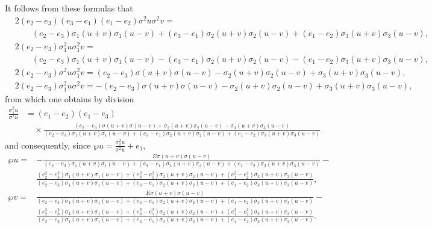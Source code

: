\documentclass{article}
\begin{document}
It follows from these formulas that
\begin{align*}
&2(e_2 - e_3)(e_3 - e_1)(e_1 - e_2)\sigma^2u\sigma^2v = \\
&\qquad (e_2 - e_3)\sigma_1(u + v)\sigma_1(u - v) + (e_3 - e_1)\sigma_2(u + v)\sigma_2(u - v) + (e_1 - e_2)\sigma_3(u + v)\sigma_3(u - v), \\
&2(e_2 - e_3)\sigma_1^2u\sigma_1^2v = \\
&\qquad(e_2 - e_3)\sigma_1(u + v)\sigma_1(u - v) - (e_3 - e_1)\sigma_2(u + v)\sigma_2(u - v) - (e_1 - e_2)\sigma_3(u + v)\sigma_3(u - v), \\
&2(e_2 - e_3)\sigma^2u\sigma_1^2v = (e_2 - e_3)\sigma(u + v)\sigma(u - v) - \sigma_2(u + v)\sigma_2(u - v) + \sigma_3(u + v)\sigma_3(u - v), \\
&2(e_2 - e_3)\sigma_1^2u\sigma^2v = -(e_2 - e_3)\sigma(u + v)\sigma(u - v) - \sigma_2(u + v)\sigma_2(u - v) + \sigma_3(u + v)\sigma_3(u - v),
\end{align*}
from which one obtains by division
\begin{align*}
\frac{\sigma_1^2u}{\sigma^2u} &= (e_1 - e_2)(e_1 - e_3) \\
&\quad \times \frac{(e_2 - e_3)\sigma(u + v)\sigma(u - v) + \sigma_2(u + v)\sigma_2(u - v) - \sigma_3(u + v)\sigma_3(u - v)}{(e_2 - e_3)\sigma_1(u + v)\sigma_1(u - v) + (e_3 - e_1)\sigma_2(u + v)\sigma_2(u - v) + (e_1 - e_2)\sigma_3(u + v)\sigma_3(u - v)}
\end{align*}
and consequently, since $\wp u = \frac{\sigma_1^2u}{\sigma^2u} + e_1$,
\begin{align*}
\wp u = & -\frac{E\sigma(u + v)\sigma(u - v)}{(e_2 - e_3)\sigma_1(u + v)\sigma_1(u - v) + (e_3 - e_1)\sigma_2(u + v)\sigma_2(u - v) + (e_1 - e_2)\sigma_3(u + v)\sigma_3(u - v)} - \\
&\frac{(e_2^2 - e_3^2)\sigma_1(u + v)\sigma_1(u - v) + (e_3^2 - e_1^2)\sigma_2(u + v)\sigma_2(u - v) + (e_1^2 - e_2^2)\sigma_3(u + v)\sigma_3(u - v)}{(e_2 - e_3)\sigma_1(u + v)\sigma_1(u - v) + (e_3 - e_1)\sigma_2(u + v)\sigma_2(u - v) + (e_1 - e_2)\sigma_3(u + v)\sigma_3(u - v)}, \\
\wp v = & \frac{E\sigma(u + v)\sigma(u - v)}{(e_2 - e_3)\sigma_1(u + v)\sigma_1(u - v) + (e_3 - e_1)\sigma_2(u + v)\sigma_2(u - v) + (e_1 - e_2)\sigma_3(u + v)\sigma_3(u - v)} - \\
& \frac{(e_2^2 - e_3^2)\sigma_1(u + v)\sigma_1(u - v) + (e_3^2 - e_1^2)\sigma_2(u + v)\sigma_2(u - v) + (e_1^2 - e_2^2)\sigma_3(u + v)\sigma_3(u - v)}{(e_2 - e_3)\sigma_1(u + v)\sigma_1(u - v) + (e_3 - e_1)\sigma_2(u + v)\sigma_2(u - v) + (e_1 - e_2)\sigma_3(u + v)\sigma_3(u - v)}.
\end{align*}
\end{document}
